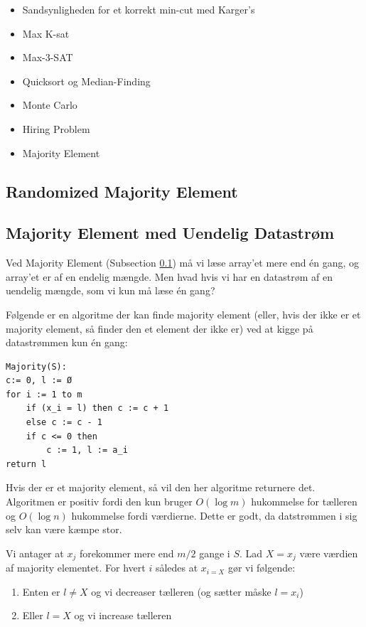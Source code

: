\documentclass[11pt]{article}
\theoremstyle{definition}
\theoremstyle{remark}
\begin{document}
\begin{itemize}
\item Sandsynligheden for et korrekt min-cut med Karger's
\item Max K-sat
\item Max-3-SAT
\item Quicksort og Median-Finding
\item Monte Carlo
\item Hiring Problem
\item Majority Element
\end{itemize}


\subsection{Randomized Majority Element}
\label{subsec:majorityelement}



\subsection{Majority Element med Uendelig Datastrøm}
\label{subsec:randommajority}

Ved Majority Element (Subsection \ref{subsec:majorityelement}) må vi læse array'et mere end én gang, og array'et er af en endelig mængde. Men hvad hvis vi har en datastrøm af en uendelig mængde, som vi kun må læse én gang?

Følgende er en algoritme der kan finde majority element (eller, hvis der ikke er et majority element, så finder den et element der ikke er) ved at kigge på datastrømmen kun én gang:

\begin{verbatim}
Majority(S):
c:= 0, l := Ø
for i := 1 to m
    if (x_i = l) then c := c + 1
    else c := c - 1
    if c <= 0 then
        c := 1, l := a_i
return l
\end{verbatim}

Hvis der er et majority element, så vil den her algoritme returnere det. Algoritmen er positiv fordi den kun bruger $O(\log m)$ hukommelse for tælleren og $O(\log n)$ hukommelse fordi værdierne. Dette er godt, da datstrømmen i sig selv kan være kæmpe stor.


Vi antager at $x_{j}$ forekommer mere end $m/2$ gange i $S$. Lad $X = x_{j}$ være værdien af majority elementet. For hvert $i$ således at $x_{i = X}$ gør vi følgende:

\begin{enumerate}
\item\label{item:1} Enten er $l \neq X$ og vi decreaser tælleren (og sætter måske $l = x_{i}$)
\item\label{item:2} Eller $l = X$ og vi increase tælleren
\end{enumerate}
\end{document}
